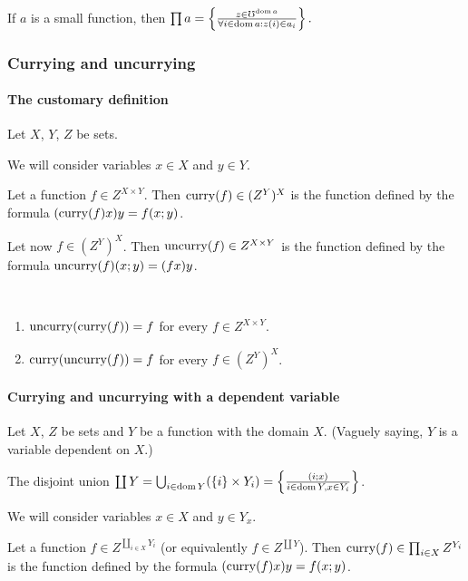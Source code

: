 \begin{obvious}
If $a$ is a small function, then $\prod a=\left\{ \frac{z\in\mho^{\operatorname{dom} a}}{\forall i\in\operatorname{dom} a:z(i)\in a_{i}}\right\}.$
\end{obvious}

\subsubsection{Currying and uncurrying}


\paragraph{The customary definition}

Let $X$, $Y$, $Z$ be sets.

We will consider variables $x\in X$ and $y\in Y$.

Let a function $f\in Z^{X\times Y}$. Then $\operatorname{curry}(f)\in(Z^{Y})^{X}$
is the function defined by the formula $(\operatorname{curry}(f)x)y=f(x;y)$.

Let now $f\in(Z^{Y})^{X}$. Then $\operatorname{uncurry}(f)\in Z^{X\times Y}$
is the function defined by the formula $\operatorname{uncurry}(f)(x;y)=(fx)y$.
\begin{obvious}
~
\begin{enumerate}
\item $\operatorname{uncurry}(\operatorname{curry}(f))=f$ for every $f\in Z^{X\times Y}$.
\item $\operatorname{curry}(\operatorname{uncurry}(f))=f$ for every $f\in(Z^{Y})^{X}$.
\end{enumerate}
\end{obvious}

\paragraph{Currying and uncurrying with a dependent variable}

Let $X$, $Z$ be sets and $Y$ be a function with the domain $X$.
(Vaguely saying, $Y$ is a variable dependent on $X$.)

The disjoint union $\coprod Y=\bigcup_{i\in\operatorname{dom} Y}(\{i\}\times Y_{i})=\left\{ \frac{(i;x)}{i\in\operatorname{dom} Y,x\in Y_{i}}\right\}$.

We will consider variables $x\in X$ and $y\in Y_{x}$.

Let a function $f\in Z^{\coprod_{i\in X}Y_{i}}$
(or equivalently $f\in Z^{\coprod Y}$). Then $\operatorname{curry}(f)\in\prod_{i\in X}Z^{Y_{i}}$
is the function defined by the formula $(\operatorname{curry}(f)x)y=f(x;y)$.

